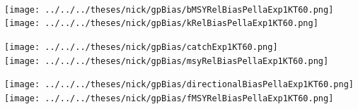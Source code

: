 \documentclass[ xcolor = pdftex, dvipsnames, table ]{beamer}
\begin{document}
{%
\begin{frame}%
$~$
\hspace*{-1.25cm}
\begin{minipage}[h!]{0.33\textwidth}
\hspace*{0.25cm}
\texttt{[image: ../../../theses/nick/gpBias/bMSYRelBiasPellaExp1KT60.png]}\\
\hspace*{0.25cm}
\texttt{[image: ../../../theses/nick/gpBias/kRelBiasPellaExp1KT60.png]}
\end{minipage}
\begin{minipage}[h!]{0.33\textwidth}
\hspace*{0.75cm}
\texttt{[image: ../../../theses/nick/gpBias/catchExp1KT60.png]}\\
\hspace*{0.75cm}
\texttt{[image: ../../../theses/nick/gpBias/msyRelBiasPellaExp1KT60.png]}
\end{minipage}
\begin{minipage}[h!]{0.33\textwidth}
\hspace*{1cm}
\texttt{[image: ../../../theses/nick/gpBias/directionalBiasPellaExp1KT60.png]}\\
\hspace*{1cm}
\texttt{[image: ../../../theses/nick/gpBias/fMSYRelBiasPellaExp1KT60.png]}
\end{minipage}
\end{frame}

}
\end{document}
